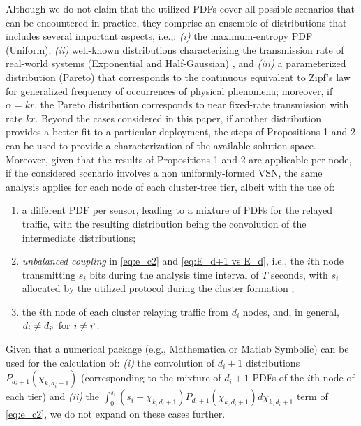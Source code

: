 \documentclass[twocolumn,english]{IEEEtran}
\theoremstyle{plain}
\theoremstyle{definition}
\begin{document}
Although we do not claim that the utilized PDFs cover all possible
scenarios that can be encountered in practice, they comprise an ensemble
of distributions that includes several important aspects, i.e.,: \emph{(i)}
the maximum-entropy PDF (Uniform); \emph{(ii)} well-known distributions
characterizing the transmission rate of real-world systems (Exponential
and Half-Gaussian) \cite{LamGoodmanDCT,foo2008analytical,DBLP:journals/tip/AndreopoulosP08,DBLP:conf/icip/TagliasacchiTS06,Dai:2009:UTM:1653034.1653052},
and \emph{(iii)} a parameterized distribution (Pareto) that corresponds
to the continuous equivalent to Zipf's law for generalized frequency
of occurrences of physical phenomena; moreover, if $\alpha=kr$, the
Pareto distribution corresponds to near fixed-rate transmission with
rate $kr$. Beyond the cases considered in this paper, if another
distribution provides a better fit to a particular deployment, the
steps of Propositions 1 and 2 can be used to provide a characterization
of the available solution space. Moreover, given that the results
of Propositions 1 and 2 are applicable per node, if the considered
scenario involves a non uniformly-formed VSN, the same analysis applies
for each node of each cluster-tree tier, albeit with the use of: 
\begin{enumerate}
\item a different PDF per sensor, leading to a mixture of PDFs for the relayed
traffic, with the resulting distribution being the convolution of
the intermediate distributions; 
\item \emph{unbalanced} \emph{coupling} in \eqref{eq:e_c2} and \eqref{eq:E_d+1 vs E_d},
i.e., the $i$th node transmitting $s_{i}$ bits during the analysis
time interval of $T$ seconds, with $s_{i}$ allocated by the utilized
protocol during the cluster formation \cite{AlvesClusterTreeGTS,citeulike:3839709,koubaa2006gts,LeungMACEssentials}; 
\item the $i$th node of each cluster relaying traffic from $d_{i}$ nodes,
and, in general, $d_{i}\neq d_{i^{\shortmid}}$ for $i\neq i^{\shortmid}$. 
\end{enumerate}
Given that a numerical package (e.g., Mathematica or Matlab Symbolic)
can be used for the calculation of: \emph{(i)} the convolution of
$d_{i}+1$ distributions $P_{d_{i}+1}\left(\chi_{k,d_{i}+1}\right)$
(corresponding to the mixture of $d_{i}+1$ PDFs of the $i$th node
of each tier) and \emph{(ii)} the $\int_{0}^{s_{i}}\left(s_{i}-\chi_{k,d_{i}+1}\right)P_{d_{i}+1}\left(\chi_{k,d_{i}+1}\right)d\chi_{k,d_{i}+1}$
term of \eqref{eq:e_c2}, we do not expand on these cases further.
\end{document}
